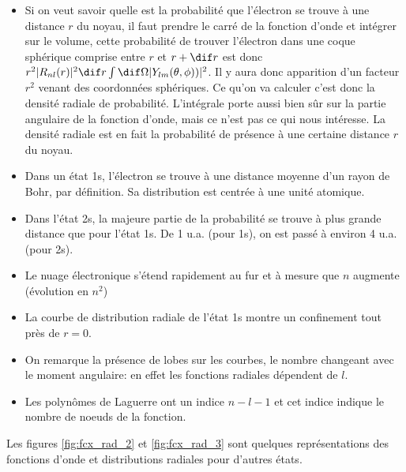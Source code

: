 \begin{itemize}[label=$\bullet$]
    \item Si on veut savoir quelle est la probabilité que l'électron se trouve à une distance $r$ du noyau, il faut prendre le carré de la fonction d'onde et intégrer sur le volume, cette probabilité de trouver l'électron dans une coque sphérique comprise entre $r$ et $r+\dif r$ est donc $r^2|R_{nl}(r)|^2\dif r\int \dif\Omega |Y_{lm}(\theta,\phi))|^2$. Il y aura donc apparition d'un facteur $r^2$ venant des coordonnées sphériques. Ce qu'on va calculer c'est donc la densité radiale de probabilité. L'intégrale porte aussi bien sûr sur la partie angulaire de la fonction d'onde, mais ce n'est pas ce qui nous intéresse. La densité radiale est en fait la probabilité de présence à une certaine distance $r$ du noyau.
    \item Dans un état 1s, l'électron se trouve à une distance moyenne d'un rayon de Bohr, par définition. Sa distribution est centrée à une unité atomique.
    \item Dans l'état 2s, la majeure partie de la probabilité se trouve à plus grande distance que pour l'état 1s. De 1 u.a. (pour 1s), on est passé à environ 4 u.a. (pour 2s).
    \item Le nuage électronique s'étend rapidement au fur et à mesure que $n$ augmente (évolution en $n^2$)
    \item La courbe de distribution radiale de l'état 1s montre un confinement tout près de $r=0$.
    \item On remarque la présence de lobes sur les courbes, le nombre changeant avec le moment angulaire: en effet les fonctions radiales dépendent de $l$.
    \item Les polynômes de Laguerre ont un indice $n-l-1$ et cet indice indique le nombre de noeuds de la fonction.
\end{itemize}

Les figures \ref{fig:fcx_rad_2} et \ref{fig:fcx_rad_3} sont quelques représentations des fonctions d'onde et distributions radiales pour d'autres états.

